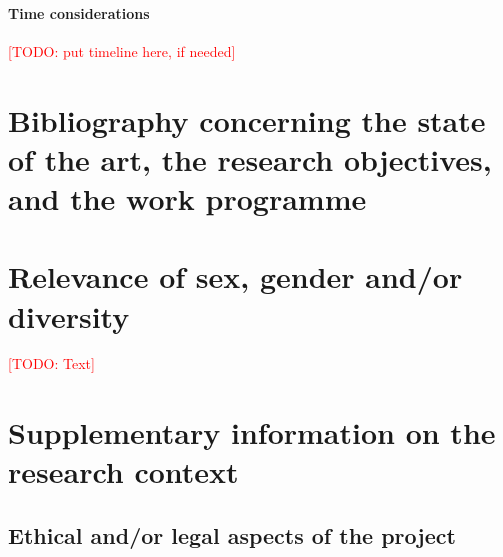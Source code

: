 \documentclass[american,firsttime]{dfgproposal}
\newcommand{\todo}[1]{\xspace{\textcolor{red}{[TODO: #1]}}\xspace}
\begin{document}
	
	\paragraph*{Time considerations}
	\todo{put timeline here, if needed}
	
	
	\section{Bibliography concerning the state of the art, the research objectives, and the work programme}
	\label{sec:bib}
	\printbibliography[notcategory=reviewed, notcategory=nonreviewed, notcategory=patents_pending, notcategory=patents, heading=none]
	
	\section{Relevance of sex, gender and/or diversity}
	\todo{Text}
	
	
	\clearpage
	\section{Supplementary information on the research context}
	
	\subsection{Ethical and/or legal aspects of the project}
	
\end{document}
